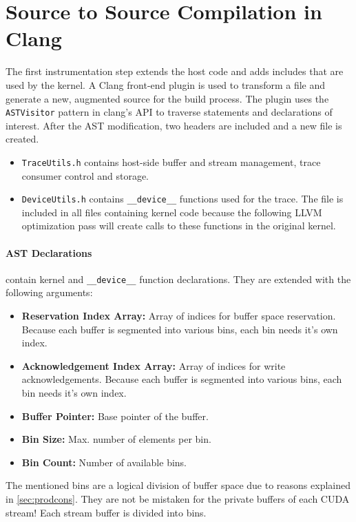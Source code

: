 \section{Source to Source Compilation in Clang}\label{sec:impl:clang}
The first instrumentation step extends the host code and adds includes that are used by the kernel. A Clang front-end
plugin is used to transform a file and generate a new, augmented source for the build process. The plugin uses the \verb|ASTVisitor| pattern in clang's API to traverse statements and declarations of interest.
After the AST modification, two headers are included and a new file is created.

\begin{itemize}
	\item \verb|TraceUtils.h| contains host-side buffer and stream management, trace consumer control and storage.
	\item \verb|DeviceUtils.h| contains \verb|__device__| functions used for the trace. The file is included in all
	files containing kernel code because the following LLVM optimization pass will create calls to these functions in the original kernel.
\end{itemize}

\paragraph{AST Declarations} contain kernel and \verb|__device__| function declarations. They are extended with the following arguments:
\begin{itemize}
	\item \textbf{Reservation Index Array:} Array of indices for buffer space reservation. Because each buffer is segmented into various bins,
		each bin needs it's own index.
	\item \textbf{Acknowledgement Index Array:} Array of indices for write acknowledgements. Because each buffer is segmented into various bins,
	each bin needs it's own index.
	\item \textbf{Buffer Pointer:} Base pointer of the buffer.
	\item \textbf{Bin Size:} Max. number of elements per bin.
	\item \textbf{Bin Count:} Number of available bins.
\end{itemize}
The mentioned bins are a logical division of buffer space due to reasons explained in \ref{sec:prodcons}. They are not be mistaken 
for the private buffers of each CUDA stream! Each stream buffer is divided into bins.

